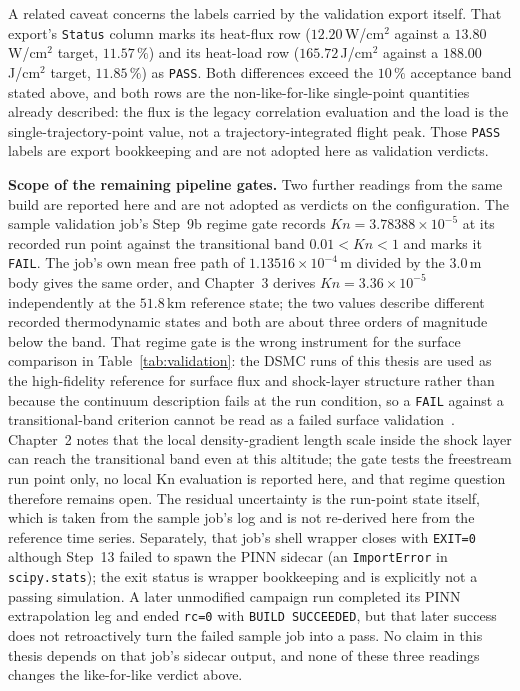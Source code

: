 \noindent A related caveat concerns the labels carried by the validation export itself. That export's \texttt{Status} column marks its heat-flux row ($12.20$\,W/cm$^2$ against a $13.80$\,W/cm$^2$ target, $11.57\,\%$) and its heat-load row ($165.72$\,J/cm$^2$ against a $188.00$\,J/cm$^2$ target, $11.85\,\%$) as \texttt{PASS}. Both differences exceed the $10\,\%$ acceptance band stated above, and both rows are the non-like-for-like single-point quantities already described: the flux is the legacy correlation evaluation and the load is the single-trajectory-point value, not a trajectory-integrated flight peak. Those \texttt{PASS} labels are export bookkeeping and are not adopted here as validation verdicts.

\noindent \textbf{Scope of the remaining pipeline gates.} Two further readings from the same build are reported here and are not adopted as verdicts on the configuration. The sample validation job's Step~9b regime gate records $Kn = 3.78388\times10^{-5}$ at its recorded run point against the transitional band $0.01 < Kn < 1$ and marks it \texttt{FAIL}. The job's own mean free path of $1.13516\times10^{-4}$\,m divided by the $3.0$\,m body gives the same order, and Chapter~3 derives $Kn = 3.36\times10^{-5}$ independently at the $51.8$\,km reference state; the two values describe different recorded thermodynamic states and both are about three orders of magnitude below the band. That regime gate is the wrong instrument for the surface comparison in Table~\ref{tab:validation}: the DSMC runs of this thesis are used as the high-fidelity reference for surface flux and shock-layer structure rather than because the continuum description fails at the run condition, so a \texttt{FAIL} against a transitional-band criterion cannot be read as a failed surface validation~\cite{bird1994molecular,tsien1946}. Chapter~2 notes that the local density-gradient length scale inside the shock layer can reach the transitional band even at this altitude; the gate tests the freestream run point only, no local Kn evaluation is reported here, and that regime question therefore remains open. The residual uncertainty is the run-point state itself, which is taken from the sample job's log and is not re-derived here from the reference time series. Separately, that job's shell wrapper closes with \texttt{EXIT=0} although Step~13 failed to spawn the PINN sidecar (an \texttt{ImportError} in \texttt{scipy.stats}); the exit status is wrapper bookkeeping and is explicitly not a passing simulation. A later unmodified campaign run completed its PINN extrapolation leg and ended \texttt{rc=0} with \texttt{BUILD SUCCEEDED}, but that later success does not retroactively turn the failed sample job into a pass. No claim in this thesis depends on that job's sidecar output, and none of these three readings changes the like-for-like verdict above.

